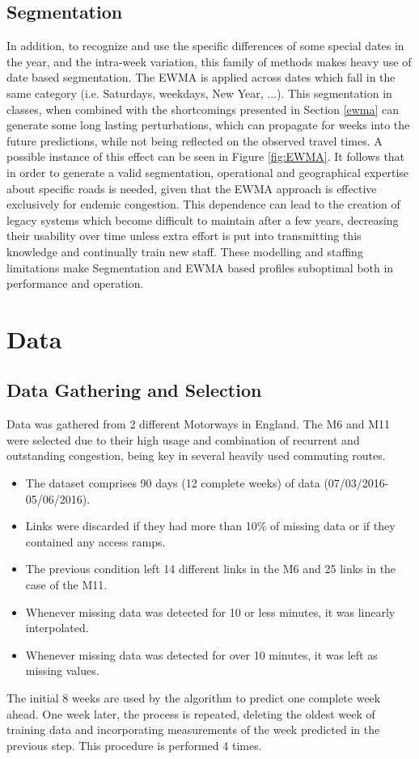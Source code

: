 \documentclass[a4paper, 10pt, conference]{ieeeconf}      %
\begin{document}
\subsection{Segmentation}\label{segmentation}
In addition, to recognize and use the specific differences of some special dates in the year, and the intra-week variation, this family of methods makes heavy use of date based segmentation. 
The EWMA is applied across dates which fall in the same category (i.e. Saturdays, weekdays, New Year, ...).
This segmentation in classes, when combined with the shortcomings presented in Section \ref{ewma} can generate some long lasting perturbations, which can propagate for weeks into the future predictions, while not being reflected on the observed travel times. A possible instance of this effect can be seen in Figure \ref{fig:EWMA}.
It follows that in order to generate a valid segmentation, operational and geographical expertise about specific roads is needed, given that the EWMA approach is effective exclusively for endemic congestion. 
This dependence can lead to the creation of legacy systems which become difficult to maintain after a few years, decreasing their usability over time unless extra effort is put into transmitting this knowledge and continually train new staff.
These modelling and staffing limitations make Segmentation and EWMA based profiles suboptimal both in performance and operation.
\section{Data}
\subsection{Data Gathering and Selection}
Data was gathered from 2 different Motorways in England.
The M6 and M11 were selected due to their high usage and combination of recurrent and outstanding congestion, being key in several heavily used commuting routes. 
\begin{itemize}
	\item The dataset comprises 90 days (12 complete weeks) of data (07/03/2016-05/06/2016).
	\item Links were discarded if they had more than 10\% of missing data or if they contained any access ramps.
	\item The previous condition left 14 different links in the M6 and 25 links in the case of the M11.
	\item Whenever missing data was detected for 10 or less minutes, it was linearly interpolated.
	\item Whenever missing data was detected for over 10 minutes, it was left as missing values.
\end{itemize}
The initial 8 weeks are used by the algorithm to predict one complete week ahead.
One week later, the process is repeated, deleting the oldest week of training data and incorporating measurements of the week predicted in the previous step. 
This procedure is performed 4 times.
\end{document}
